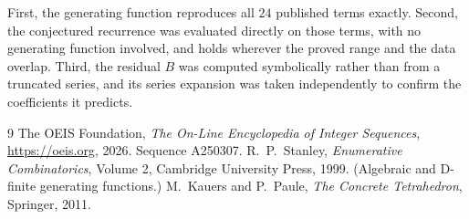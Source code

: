 \documentclass[11pt,a4paper]{article}
\theoremstyle{plain}
\theoremstyle{definition}
\begin{document}
First, the generating function reproduces all $24$ published terms exactly. Second,
the conjectured recurrence was evaluated directly on those terms, with no generating function
involved, and holds wherever the proved range and the data overlap. Third, the residual $B$ was
computed symbolically rather than from a truncated series, and its series expansion was taken
independently to confirm the coefficients it predicts.

\begin{thebibliography}{9}
 The OEIS Foundation, \emph{The On-Line Encyclopedia of Integer Sequences},
\url{https://oeis.org}, 2026. Sequence A250307.
 R.~P.~Stanley, \emph{Enumerative Combinatorics}, Volume 2, Cambridge
University Press, 1999. (Algebraic and D-finite generating functions.)
 M.~Kauers and P.~Paule, \emph{The Concrete Tetrahedron}, Springer, 2011.
\end{thebibliography}
\end{document}
